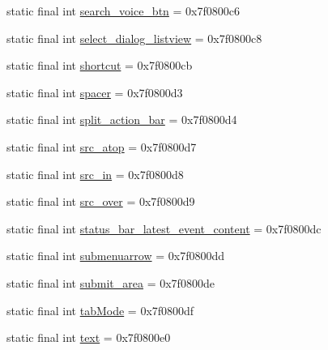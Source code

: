 \begin{DoxyCompactItemize}
\item 
static final int \mbox{\hyperlink{classandroid_1_1support_1_1v7_1_1appcompat_1_1R_1_1id_a7d142ddff5b4fc44eccc940e9637cc13}{search\+\_\+voice\+\_\+btn}} = 0x7f0800c6
\item 
static final int \mbox{\hyperlink{classandroid_1_1support_1_1v7_1_1appcompat_1_1R_1_1id_a770539389d1ac0acea54ed3fa5bd4678}{select\+\_\+dialog\+\_\+listview}} = 0x7f0800c8
\item 
static final int \mbox{\hyperlink{classandroid_1_1support_1_1v7_1_1appcompat_1_1R_1_1id_a5e6c07eab32d329b1534a1746d1beb00}{shortcut}} = 0x7f0800cb
\item 
static final int \mbox{\hyperlink{classandroid_1_1support_1_1v7_1_1appcompat_1_1R_1_1id_af3d077d30ddf6ee7ab53a8fd12b9066d}{spacer}} = 0x7f0800d3
\item 
static final int \mbox{\hyperlink{classandroid_1_1support_1_1v7_1_1appcompat_1_1R_1_1id_a741149a72fc9b9aaf02b0346115459e2}{split\+\_\+action\+\_\+bar}} = 0x7f0800d4
\item 
static final int \mbox{\hyperlink{classandroid_1_1support_1_1v7_1_1appcompat_1_1R_1_1id_ab3834f6ee23ff8baa7614ca68366bf1f}{src\+\_\+atop}} = 0x7f0800d7
\item 
static final int \mbox{\hyperlink{classandroid_1_1support_1_1v7_1_1appcompat_1_1R_1_1id_a0302dbca2cbbbe0e6d36f6332939c370}{src\+\_\+in}} = 0x7f0800d8
\item 
static final int \mbox{\hyperlink{classandroid_1_1support_1_1v7_1_1appcompat_1_1R_1_1id_a8e4a43230fb4b6e5ccb4a6d151bfab22}{src\+\_\+over}} = 0x7f0800d9
\item 
static final int \mbox{\hyperlink{classandroid_1_1support_1_1v7_1_1appcompat_1_1R_1_1id_a28d5a0cf4e27984507bcda1c338b40a1}{status\+\_\+bar\+\_\+latest\+\_\+event\+\_\+content}} = 0x7f0800dc
\item 
static final int \mbox{\hyperlink{classandroid_1_1support_1_1v7_1_1appcompat_1_1R_1_1id_a4af9872688d34e2e585113cf9f31968e}{submenuarrow}} = 0x7f0800dd
\item 
static final int \mbox{\hyperlink{classandroid_1_1support_1_1v7_1_1appcompat_1_1R_1_1id_a3ba0b5cb29db70be085cc78170b1020e}{submit\+\_\+area}} = 0x7f0800de
\item 
static final int \mbox{\hyperlink{classandroid_1_1support_1_1v7_1_1appcompat_1_1R_1_1id_a9f4b211ddf6dcd1ba76c5031f318dfca}{tab\+Mode}} = 0x7f0800df
\item 
static final int \mbox{\hyperlink{classandroid_1_1support_1_1v7_1_1appcompat_1_1R_1_1id_a2930aafc4caa3944336307aaf845eefa}{text}} = 0x7f0800e0

\end{DoxyCompactItemize}
